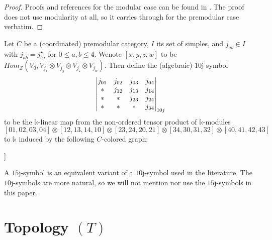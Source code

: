 \begin{proof}
  Proofs and references for the modular case can be found in
  \cite[section VI.5.4]{turaev-qiok-3-manifolds}. The proof does
  not use modularity at all, so it carries through for the
  premodular case verbatim.
\end{proof}

\begin{definition}[$10$j-symbol]\label{def/10j-symbol}
  Let $C$ be a (coordinated) premodular category, $I$ its set of
  simples, and $j_{ab} \in I$ with $j_{ab} = j_{ba}^{\star}$ for
  $0 \leq a, b \leq 4$.
  Wenote $[x,y,z,w]$ to be
  $Hom_{Z}(V_{0}, V_{j_{x}} \otimes V_{j_{y}} \otimes V_{j_{z}} \otimes V_{j_{w}})$.
  Then define the (algebraic) $10$j symbol
  $$
  \begin{vmatrix} j_{01} & j_{02} & j_{03} & j_{04} \\ * & j_{12} & j_{13} & j_{14} \\ * & * & j_{23} & j_{24} \\ * & * & * & j_{34} \\ \end{vmatrix}_{10j}
  $$
  to be the $\mathbb{k}$-linear map from the non-ordered tensor
  product of $\mathbb{k}$-modules
  $$
  [01,02,03,04] \otimes
  [12,13,14,10] \otimes
  [23,24,20,21] \otimes
  [34,30,31,32] \otimes
  [40,41,42,43]
  $$
  to $\mathbb{k}$ induced by the following $C$-colored graph:

  \noindent [TODO:add graphics [20220217T143000(2)]]
\end{definition}

\begin{remark}[$15$j-symbol]\label{remark/15j-symbol}
  A $15$j-symbol is an equivalent variant of a $10$j-symbol used
  in the literature. The $10$j-symbols are more natural, so we
  will not mention nor use the $15$j-symbols in this paper.
\end{remark}

\section{Topology $(T)$}\label{section/topology}
